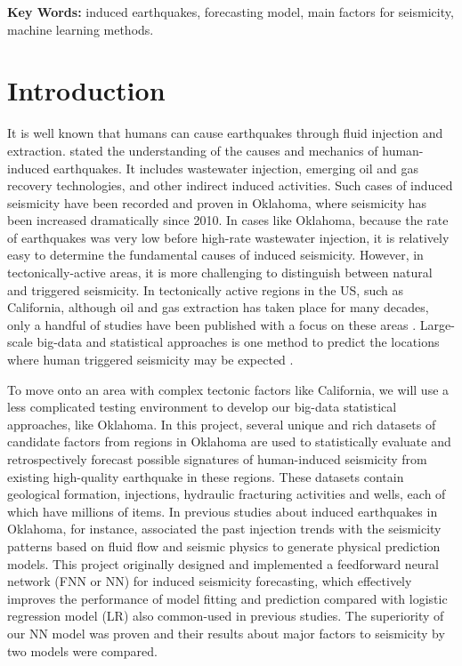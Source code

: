 \documentclass[final-report]{report-template}
\begin{document}
\textbf{Key Words:} induced earthquakes, forecasting model, main factors for seismicity, machine learning methods.
\newpage

\section{Introduction}
It is well known that humans can cause earthquakes through fluid injection and extraction. \citep{ellsworth2013injection} stated the understanding of the causes and mechanics of human-induced earthquakes. It includes wastewater injection, emerging oil and gas recovery technologies, and other indirect induced activities.
Such cases of induced seismicity have been recorded and proven in Oklahoma, where seismicity has been increased dramatically since 2010.
In cases like Oklahoma, because the rate of earthquakes was very low before high-rate wastewater injection, it is relatively easy to determine the fundamental causes of induced seismicity.
However, in tectonically-active areas, it is more challenging to distinguish between natural and triggered seismicity.
In tectonically active regions in the US, such as California, although oil and gas extraction has taken place for many decades, only a handful of studies have been published with a focus on these areas \citep{Hough2017WasTM}. 
Large-scale big-data and statistical approaches is one method to predict the locations where human triggered seismicity may be expected \citep{hincks2018oklahoma}.

To move onto an area with complex tectonic factors like California, we will use a less complicated testing environment to develop our big-data statistical approaches, like Oklahoma.
In this project, several unique and rich datasets of candidate factors from regions in Oklahoma are used to statistically evaluate and retrospectively forecast possible signatures of human-induced seismicity from existing high-quality earthquake in these regions. 
These datasets contain geological formation, injections, hydraulic fracturing activities and wells, each of which have millions of items.
In previous studies about induced earthquakes in Oklahoma, for instance, \citep{norbeck2018hydromechanical} associated the past injection trends with the seismicity patterns based on fluid flow and seismic physics to generate physical prediction models.
This project originally designed and implemented a feedforward neural network (FNN or NN) for induced seismicity forecasting, which effectively improves the performance of model fitting and prediction compared with logistic regression model (LR) also common-used in previous studies.
The superiority of our NN model was proven and their results about major factors to seismicity by two models were compared.
\end{document}
